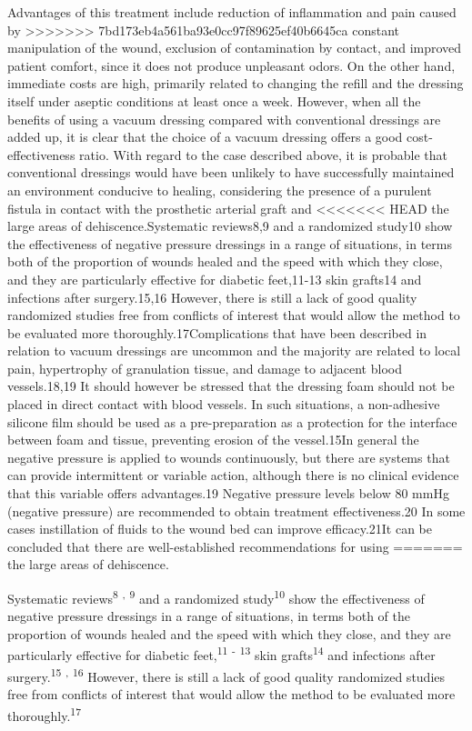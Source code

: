 \documentclass[numberinsection,times,10pt,spreadimages]{memoir}
\begin{document}
Advantages of this treatment include reduction of inflammation and pain caused
by
>>>>>>> 7bd173eb4a561ba93e0cc97f89625ef40b6645ca
constant manipulation of the wound, exclusion of contamination by contact, and
improved patient comfort, since it does not produce unpleasant odors. On the
other hand, immediate costs are high, primarily related to changing the refill
and the dressing itself under aseptic conditions at least once a week. However,
when all the benefits of using a vacuum dressing compared with conventional
dressings are added up, it is clear that the choice of a vacuum dressing offers
a good cost-effectiveness ratio. With regard to the case described above, it is
probable that conventional dressings would have been unlikely to have
successfully maintained an environment conducive to healing, considering the
presence of a purulent fistula in contact with the prosthetic arterial graft and
<<<<<<< HEAD
the large areas of dehiscence.Systematic reviews8,9 and a randomized study10
show the effectiveness of negative pressure
dressings in a range of situations, in terms both of the proportion of wounds
healed and the speed with which they close, and they are particularly effective
for diabetic feet,11-13 skin grafts14 and infections after surgery.15,16
However, there is still a lack of good quality
randomized studies free from conflicts of interest that would allow the method
to be evaluated more thoroughly.17Complications that have been described in
relation to vacuum dressings are
uncommon and the majority are related to local pain, hypertrophy of granulation
tissue, and damage to adjacent blood vessels.18,19 It should however be stressed
that the dressing
foam should not be placed in direct contact with blood vessels. In such
situations, a non-adhesive silicone film should be used as a pre-preparation as
a protection for the interface between foam and tissue, preventing erosion of
the vessel.15In general the negative pressure is applied to wounds continuously,
but there are
systems that can provide intermittent or variable action, although there is no
clinical evidence that this variable offers advantages.19 Negative pressure
levels below 80 mmHg
(negative pressure) are recommended to obtain treatment effectiveness.20 In some
cases instillation
of fluids to the wound bed can improve efficacy.21It can be concluded that there
are well-established recommendations for using
=======
the large areas of dehiscence.

Systematic reviews\textsuperscript{8}
\textsuperscript{,}
\textsuperscript{9}
and a randomized study\textsuperscript{10}
show the effectiveness of negative pressure
dressings in a range of situations, in terms both of the proportion of wounds
healed and the speed with which they close, and they are particularly effective
for diabetic feet,\textsuperscript{11}
\textsuperscript{-}
\textsuperscript{13}
skin grafts\textsuperscript{14}
and infections after surgery.\textsuperscript{15}
\textsuperscript{,}
\textsuperscript{16}
However, there is still a lack of good quality
randomized studies free from conflicts of interest that would allow the method
to be evaluated more thoroughly.\textsuperscript{17}
\end{document}
